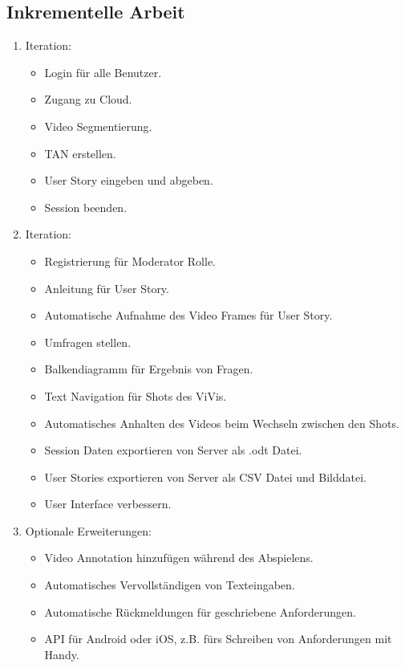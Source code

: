 	\subsection{Inkrementelle Arbeit}
		\begin{enumerate}
			\item Iteration:
			\begin{itemize}
				\item Login für alle Benutzer.
				\item Zugang zu Cloud.
				\item Video Segmentierung.
				\item TAN erstellen.
				\item User Story eingeben und abgeben.
				\item Session beenden.
			\end{itemize}
			\item Iteration:
			\begin{itemize}
				\item Registrierung für Moderator Rolle.
				\item Anleitung für User Story.
				\item Automatische Aufnahme des Video Frames für User Story.
				\item Umfragen stellen.
				\item Balkendiagramm für Ergebnis von Fragen.
				\item Text Navigation für Shots des ViVis.
				\item Automatisches Anhalten des Videos beim Wechseln zwischen den Shots.
				\item Session Daten exportieren von Server als .odt Datei.
				\item User Stories exportieren von Server als CSV Datei und Bilddatei.
				\item User Interface verbessern.
			\end{itemize}
			\item Optionale Erweiterungen:
			\begin{itemize}
				\item Video Annotation hinzufügen während des Abspielens.
				\item Automatisches Vervollständigen von Texteingaben.
				\item Automatische Rückmeldungen für geschriebene Anforderungen.
				\item API für Android oder iOS, z.B. fürs Schreiben von Anforderungen mit Handy.
			\end{itemize}
		\end{enumerate}


		